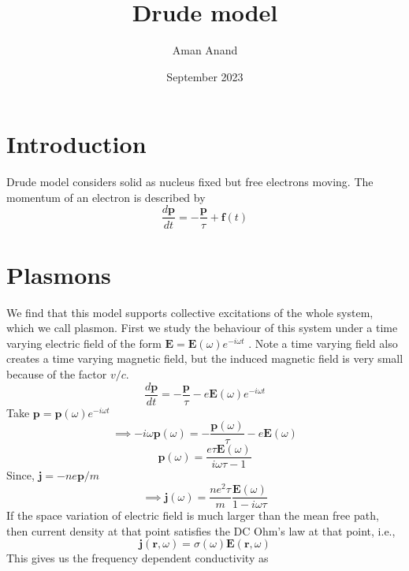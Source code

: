 \documentclass{article}
\title{Drude model}
\author{Aman Anand}
\date{September 2023}
\begin{document}
	
	\maketitle
	
	\section{Introduction}
	
	Drude model considers solid as nucleus fixed but free electrons moving. The momentum of an electron is described by
	\begin{equation}
		\frac{d\mathbf{p}}{dt} = -\frac{\mathbf{p}}{\tau}+\mathbf{f}(t)
	\end{equation}
	
	\section{Plasmons}
	We find that this model supports collective excitations of the whole system, which we call plasmon. First we study the behaviour of this system under a time varying electric field of the form $\mathbf{E} = \mathbf{E}(\omega)e^{-i\omega t}$
. Note a time varying field also creates a time varying magnetic field, but the induced magnetic field is very small because of the factor $v/c$.	
\begin{equation}
	\frac{d\mathbf{p}}{dt} = -\frac{\mathbf{p}}{\tau}-e\mathbf{E}(\omega)e^{-i\omega t}
\end{equation}
	Take $\mathbf{p} = \mathbf{p}(\omega)e^{-i\omega t}$
	\begin{equation}
		\implies -i\omega \mathbf{p}(\omega) = -\frac{\mathbf{p}(\omega)}{\tau}-e\mathbf{E}(\omega)
	\end{equation}
	\begin{equation}
		\mathbf{p}(\omega) = \frac{e\tau\mathbf{E}(\omega)}{i\omega \tau - 1}
	\end{equation}
Since, $\mathbf{j} = -ne\mathbf{p}/m$
\begin{equation}
	\implies \mathbf{j} (\omega) = \frac{ne^2 \tau}{m}\frac{\mathbf{E}(\omega)}{1-i\omega \tau }
\end{equation}
If the space variation of electric field is much larger than the mean free path, then current density at that point satisfies the DC Ohm's law at that point, i.e.,
\begin{equation}
	\mathbf{j}(\mathbf{r},\omega) = \sigma(\omega) \mathbf{E}(\mathbf{r},\omega) 
\end{equation}
This gives us the frequency dependent conductivity as
\end{document}
